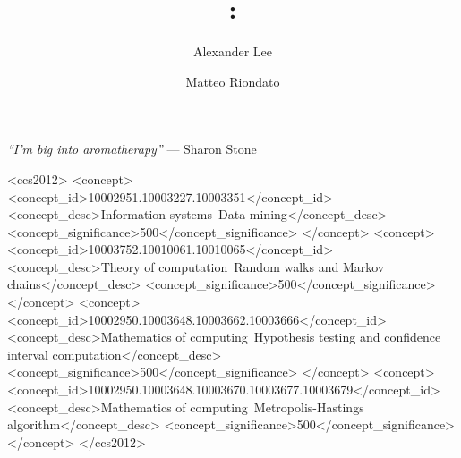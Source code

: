 \documentclass[sigconf,review,anonymous]{acmart}
\begin{document}
\title[\algoname: \titlefirstpart\ \titlesecondpart]{\texorpdfstring{\algoname: \titlefirstpart\\ \titlesecondpart}{\algoname: \titlefirstpart\ \titlesecondpart}}

\author{Alexander Lee}

\author{Matteo Riondato}

\begin{teaserfigure}
  \noindent\textit{``I'm big into aromatherapy''} --- Sharon Stone
\end{teaserfigure}



\begin{CCSXML}
<ccs2012>
   <concept>
       <concept_id>10002951.10003227.10003351</concept_id>
       <concept_desc>Information systems~Data mining</concept_desc>
       <concept_significance>500</concept_significance>
       </concept>
   <concept>
       <concept_id>10003752.10010061.10010065</concept_id>
       <concept_desc>Theory of computation~Random walks and Markov chains</concept_desc>
       <concept_significance>500</concept_significance>
       </concept>
   <concept>
       <concept_id>10002950.10003648.10003662.10003666</concept_id>
       <concept_desc>Mathematics of computing~Hypothesis testing and confidence interval computation</concept_desc>
       <concept_significance>500</concept_significance>
       </concept>
   <concept>
       <concept_id>10002950.10003648.10003670.10003677.10003679</concept_id>
       <concept_desc>Mathematics of computing~Metropolis-Hastings algorithm</concept_desc>
       <concept_significance>500</concept_significance>
       </concept>
</ccs2012>
\end{CCSXML}

\end{document}
